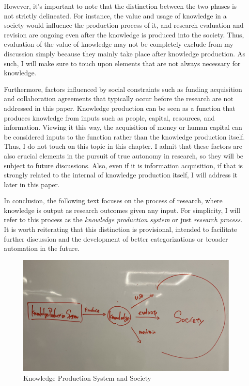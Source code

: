 \documentclass{article}
\begin{document}
However, it's important to note that the distinction between the two phases is not strictly delineated. For instance, the value and usage of knowledge in a society would influence the production process of it, and research evaluation and revision are ongoing even after the knowledge is produced into the society. Thus, evaluation of the value of knowledge may not be completely exclude from my discussion simply because they mainly take place after knowledge production. As such, I will make sure to touch upon elements that are not always necessary for knowledge. 

Furthermore, factors influenced by social constraints such as funding acquisition and collaboration agreements that typically occur before the research are not addressed in this paper. Knowledge production can be seen as a function that produces knowledge from inputs such as people, capital, resources, and information. Viewing it this way, the acquisition of money or human capital can be considered inputs to the function rather than the knowledge production itself. Thus, I do not touch on this topic in this chapter. I admit that these factors are also crucial elements in the pursuit of true autonomy in research, so they will be subject to future discussions. Also, even if it is information acquisition, if that is strongly related to the internal of knowledge production itself, I will address it later in this paper. 

In conclusion, the following text focuses on the process of research, where knowledge is output as research outcomes given any input. For simplicity, I will refer to this process as the \textit{knowledge production system} or just \textit{research process}. It is worth reiterating that this distinction is provisional, intended to facilitate further discussion and the development of better categorizations or broader automation in the future.

\begin{figure}[htb]
    \centering
    \includegraphics[width=\linewidth]{figs/research_process_society.jpg}
    \caption{Knowledge Production System and Society}
    \label{fig:research_process_society}
\end{figure}
\end{document}

